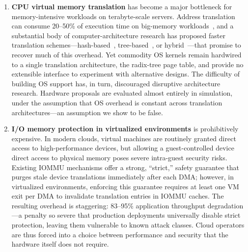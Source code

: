 \begin{enumerate}
\item \textbf{CPU virtual memory translation} has become a major bottleneck for
    memory-intensive workloads on terabyte-scale servers.
    Address translation can consume 20--50\% of execution time on big-memory
    workloads~\cite{basu2013efficient,gupta2021midgard,kwon2016coordinated,margaritov2019asap},
    and a substantial body of computer-architecture research has
    proposed faster translation schemes---hash-based~\cite{skarlatos2020ecpt,yaniv2016hash,jovan2022nestedecpt},
    tree-based~\cite{park2022fpt}, or hybrid~\cite{alam2017doityourself,kanellopoulos2023utopia}---that
    promise to recover much of this overhead.
    Yet commodity OS kernels remain hardwired to a single translation
    architecture, the radix-tree page table, and provide no extensible interface
    to experiment with alternative designs.
    The difficulty of building OS support has, in turn, discouraged disruptive
    architecture research.
    Hardware proposals are evaluated almost entirely in simulation, under the
    assumption that OS overhead is constant across translation architectures---an
    assumption we show to be false.

\item \textbf{I/O memory protection in virtualized environments} is prohibitively
    expensive.
    In modern clouds, virtual machines are routinely granted direct access to
    high-performance devices, but allowing a guest-controlled device direct
    access to physical memory poses severe intra-guest security risks.
    Existing IOMMU mechanisms offer a strong, ``strict,'' safety guarantee that
    purges stale device translations immediately after each DMA;
    however, in virtualized environments, enforcing this guarantee requires at
    least one VM exit per DMA to invalidate translation entries in IOMMU caches.
    The resulting overhead is staggering: 83--95\% application throughput
    degradation---a penalty so severe that production deployments universally
    disable strict protection, leaving them vulnerable to known attack classes.
    Cloud operators are thus forced into a choice between performance and
    security that the hardware itself does not require.


\end{enumerate}
